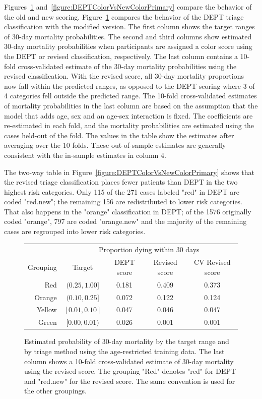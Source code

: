 Figures~\ref{figure:mort30RatesByColorPrimary} and~\ref{figure:DEPTColorVsNewColorPrimary} compare the behavior of the old and new scoring.   Figure~\ref{figure:mort30RatesByColorPrimary} compares the behavior of the DEPT triage classification with the modified version.  The first column shows the target ranges of 30-day mortality probabilities.  The second and third columns show estimated 30-day mortality probabilities when participants are assigned a color score using the DEPT or revised classification, respectively.  The last column contains a 10-fold cross-validated estimate of the 30-day mortality probabilities using the revised classification. With the revised score, all 30-day mortality proportions now fall within the predicted ranges, as opposed to the DEPT scoring where 3 of 4 categories fell outside the predicted range.  The 10-fold cross-validated estimates of mortality probabilities in the last column are based on the assumption that the model that adds age, sex and an age-sex interaction is fixed.  The coefficients are re-estimated in each fold, and the mortality probabilities are estimated using the cases held-out of the fold.  The values in the table show the estimates after averaging over the 10 folds.  These out-of-sample estimates are generally consistent with the in-sample estimates in column 4.

The two-way table in Figure~\ref{figure:DEPTColorVsNewColorPrimary} shows that the revised triage classification places fewer patients than DEPT in the two highest risk categories.  Only 115 of the 271 cases labeled "red" in DEPT are coded "red.new"; the remaining 156 are redistributed to lower risk categories.  That also happens in the "orange" classification in DEPT; of the 1576 originally coded "orange", 797 are coded "orange.new" and the majority of the remaining cases are regrouped into lower risk categories.


\begin{figure}[ht]
\centering
\begin{tabular}{rcccc}
  \hline
  & \multicolumn{4}{c}{Proportion dying within 30 days} \\
 Grouping & Target & DEPT score & Revised score & CV Revised score \\
  \hline
Red &  $(0.25, 1.00]$ & 0.181 & 0.409 & 0.373 \\
  Orange & $(0.10, 0.25]$ & 0.072 & 0.122 & 0.124\\
  Yellow & $[0.01, 0.10]$ & 0.047 & 0.046 & 0.047 \\
  Green &  $[0.00, 0.01)$ & 0.026 & 0.001 & 0.001 \\
   \hline
\end{tabular}
\caption{Estimated probability of 30-day mortality by the target range and by triage method using the age-restricted training data.  The last column shows a 10-fold cross-validated estimate of 30-day mortality using the revised score.  The grouping "Red" denotes "red" for DEPT and "red.new" for the revised score.  The same convention is used for the other groupings.}
\label{figure:mort30RatesByColorPrimary}
\end{figure}

